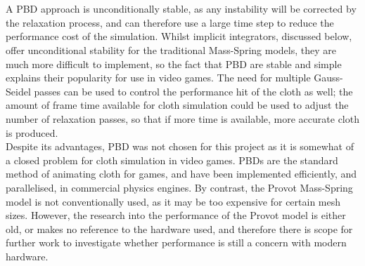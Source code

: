 \\\\A PBD approach is unconditionally stable, as any instability will be corrected by the relaxation process, and can therefore use a large time step to reduce the performance cost of the simulation. Whilst implicit integrators, discussed below, offer unconditional stability for the traditional Mass-Spring models, they are much more difficult to implement, so the fact that PBD are stable and simple explains their popularity for use in video games. The need for multiple Gauss-Seidel passes can be used to control the performance hit of the cloth as well; the amount of frame time available for cloth simulation could be used to adjust the number of relaxation passes, so that if more time is available, more accurate cloth is produced.
\\Despite its advantages, PBD was not chosen for this project as it is somewhat of  a closed problem for cloth simulation in video games. PBDs are the standard method of animating cloth for games, and have been implemented efficiently, and parallelised, in commercial physics engines. By contrast, the Provot Mass-Spring model is not conventionally used, as it may be too expensive for certain mesh sizes. However, the research into the performance of the Provot model is either old, or makes no reference to the hardware used, and therefore there is scope for further work to investigate whether performance is still a concern with modern hardware.


